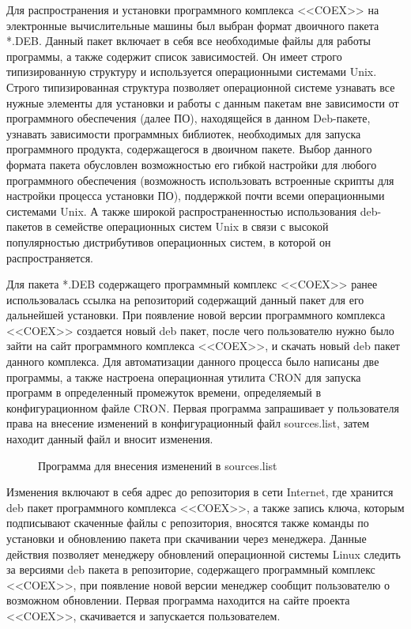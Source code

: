 Для распространения и установки программного комплекса <<COEX>> на электронные вычислительные машины был выбран формат двоичного пакета *.DEB. Данный пакет включает в себя все необходимые файлы для работы программы, а также содержит список зависимостей. Он имеет строго типизированную структуру и используется операционными системами Unix. Строго типизированная структура позволяет операционной системе узнавать все нужные элементы для установки и работы с данным пакетам вне зависимости от программного обеспечения (далее ПО), находящейся в данном Deb-пакете, узнавать зависимости программных библиотек, необходимых для запуска программного продукта, содержащегося в двоичном пакете.  Выбор данного формата пакета обусловлен возможностью его гибкой настройки для любого программного обеспечения (возможность использовать встроенные скрипты для настройки процесса установки ПО), поддержкой почти всеми операционными системами Unix. А также широкой распространенностью использования deb-пакетов в семействе операционных систем Unix в связи с высокой популярностью дистрибутивов операционных систем, в которой он распространяется.~\cite{tecmint}  

Для пакета *.DEB содержащего программный комплекс <<COEX>> ранее использовалась ссылка на репозиторий содержащий данный пакет для его дальнейшей установки. При появление новой версии программного комплекса <<COEX>> создается новый deb пакет, после чего пользователю нужно было зайти на сайт программного комплекса <<COEX>>, и скачать новый deb пакет данного комплекса. Для автоматизации данного процесса было написаны две программы, а также настроена операционная утилита CRON для запуска программ в определенный промежуток времени, определяемый в конфигурационном файле CRON. Первая программа запрашивает у пользователя права на внесение изменений в конфигурационный файл sources.list, затем находит данный файл и вносит изменения. 

\begin{figure}[h!]
\caption{ Программа для внесения изменений в sources.list }
\label{ser_1:ser_1}
\end{figure}

Изменения включают в себя адрес до репозитория   в сети Internet, где хранится deb пакет программного комплекса <<COEX>>, а также запись ключа, которым подписывают скаченные файлы с репозитория, вносятся также команды по установки и обновлению пакета при скачивании через менеджера. Данные действия позволяет менеджеру обновлений операционной системы Linux следить за версиями deb пакета в репозиторие, содержащего программный комплекс <<COEX>>, при появление новой версии менеджер сообщит пользователю о возможном обновлении. Первая программа находится на сайте проекта <<COEX>>, скачивается и запускается пользователем. 

